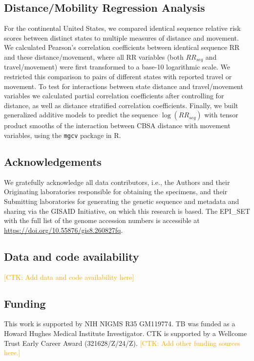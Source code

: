 \documentclass[11pt, letterpaper, oneside]{article}
\def\ctkc#1{\textcolor{orange}{[CTK: #1]}}
\begin{document}
\subsection{Distance/Mobility Regression Analysis}

For the continental United States, we compared identical sequence relative risk scores between distinct states to multiple measures of distance and movement.
We calculated Pearson's correlation coefficients between identical sequence RR and these distance/movement, where all RR variables (both $RR_{seq}$ and travel/movement) were first transformed to a base-10 logarithmic scale.
We restricted this comparison to pairs of different states with reported travel or movement.
To test for interactions between state distance and travel/movement variables we calculated partial correlation coefficients after controlling for distance, as well as distance stratified correlation coefficients.
Finally, we built generalized additive models to predict the sequence $\log(RR_{seq})$ with tensor product smooths of the interaction between CBSA distance with movement variables, using the \texttt{mgcv} package in R.\autocite{woodGeneralizedAdditiveModels2017}

\subsection*{Acknowledgements}

We gratefully acknowledge all data contributors, i.e., the Authors and their Originating laboratories responsible for obtaining the specimens, and their Submitting laboratories for generating the genetic sequence and metadata and sharing via the GISAID Initiative, on which this research is based.
The EPI\_SET with the full list of the genome accession numbers is accessible at \url{https://doi.org/10.55876/gis8.260827fq}.

\subsection*{Data and code availability}
\ctkc{Add data and code availability here}

\subsection*{Funding}
This work is supported by NIH NIGMS R35 GM119774.
TB was funded as a Howard Hughes Medical Institute Investigator.
CTK is supported by a Wellcome Trust Early Career Award (321628/Z/24/Z).
\ctkc{Add other funding sources here.}
\end{document}
